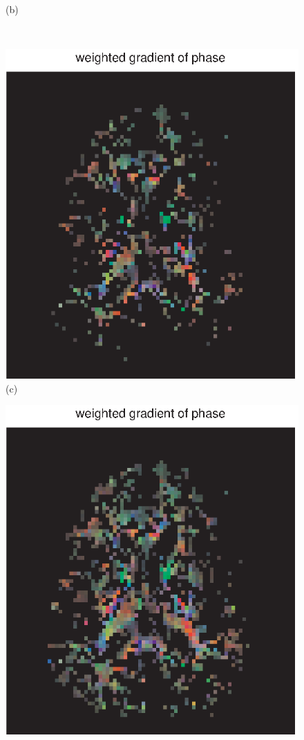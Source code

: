 \documentclass[authoryear,preprint,12pt]{elsarticle}
\begin{document}
\begin{figure}[p]
\begin{center}
\begin{minipage}[]{.42\textwidth}
        (b)
      \end{minipage}\\
       \begin{minipage}[]{.42\textwidth}
      \centering
       \includegraphics[width=\textwidth]{gradphase55b.eps}
         (c)
      \end{minipage}
        \begin{minipage}[]{.42\textwidth}
      \centering
      \includegraphics[width=\textwidth]{gradphase55d.eps}

\end{minipage}
\end{center}
\end{figure}
\end{document}
